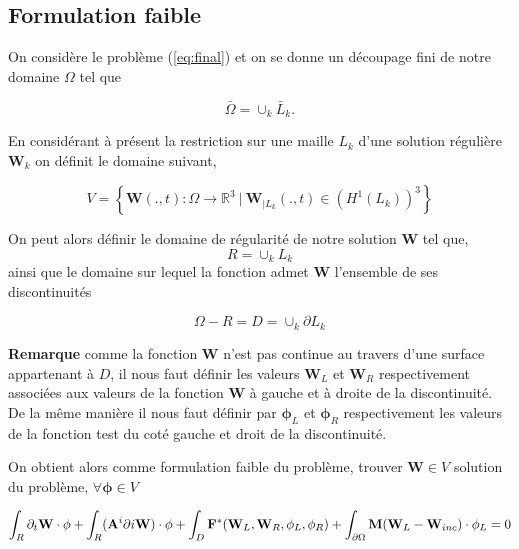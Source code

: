 \documentclass[a4paper,oneside,10pt]{report}
\begin{document}
\subsection{Formulation faible}

On considère le problème (\ref{eq:final}) et on se donne un découpage fini de notre domaine $\Omega$ tel que

\begin{equation}
\bar{\Omega} = \cup_k \bar{L}_k.
\end{equation}

En considérant à présent la restriction sur une maille $L_k$ d'une solution régulière $\mathbf{W}_k$ on définit le domaine suivant,

\begin{equation}
V = \left\{\mathbf{W}(.,t) : \Omega \rightarrow \mathbb{R}^3\ | \ \mathbf{W}_{|L_k}(.,t) \in  (H^1(L_k))^3 \right\}
\end{equation}


On peut alors définir le domaine de régularité de notre solution $\mathbf{W}$ tel que,
\begin{equation}
R = \cup_k L_k
\end{equation} 
ainsi que le domaine sur lequel la fonction admet $\mathbf{W}$ l'ensemble de ses discontinuités

\begin{equation}
\Omega - R = D = \cup_k \partial L_k
\end{equation}


\textbf{Remarque} comme la fonction $\mathbf{W}$ n'est pas continue au travers d'une surface appartenant à $D$, il nous faut définir les valeurs $\mathbf{W}_L$ et $\mathbf{W}_R$ respectivement associées aux valeurs de la fonction $\mathbf{W}$ à gauche et à droite de la discontinuité. De la même manière il nous faut définir par $\mathbf{\phi}_L$ et $\mathbf{\phi}_R$ respectivement les valeurs de la fonction test du coté gauche et droit de la discontinuité. 
\newline

On obtient alors comme formulation faible du problème, trouver $\mathbf{W} \in V$ solution du problème, $\forall \mathbf{\phi} \in V$

\begin{equation}
\int_R \partial_t \mathbf{W} \cdot \mathbf{\phi}+
\int_R  (\mathbf{A}^i \partial i \mathbf{W}) \cdot \mathbf{\phi}+
\int_D \mathbf{F}^*(\mathbf{W}_L,\mathbf{W}_R,\mathbf{\phi}_L,\mathbf{\phi}_R)+
\int_{\partial \Omega} \mathbf{M}(\mathbf{W}_L - \mathbf{W}_{inc})\cdot \mathbf{\phi}_L=0\\
\end{equation}
\end{document}
